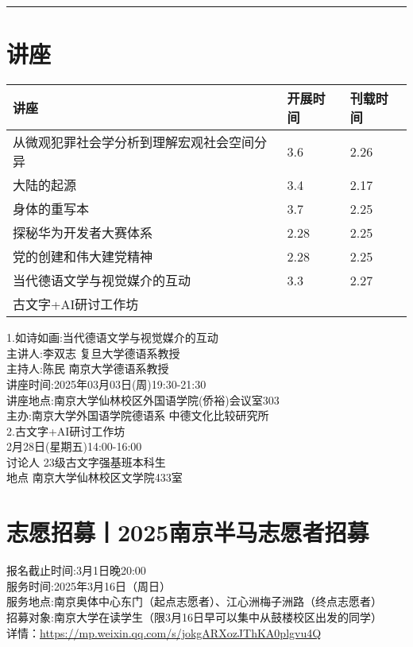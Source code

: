 \documentclass[letterpaper, 12pt]{article}
\begin{document}
\hrule
\pagebreak
\begin{multicols}{2}

\section{讲座}
\begin{tabular}{|>{\centering\arraybackslash}m{}|m{}|m{}|}
    \hline
    讲座 & 开展时间 & 刊载时间\\

    \hline\hline
    从微观犯罪社会学分析到理解宏观社会空间分异   &3.6  &2.26 \\\hline
    大陆的起源 & 3.4 & 2.17\\\hline
    身体的重写本 & 3.7 & 2.25\\\hline
    探秘华为开发者大赛体系 & 2.28 & 2.25\\\hline
    党的创建和伟大建党精神 & 2.28 & 2.25\\\hline
    当代德语文学与视觉媒介的互动 & 3.3 & 2.27\\\hline
    古文字+AI研讨工作坊\\\hline
\end{tabular}
1.如诗如画:当代德语文学与视觉媒介的互动\\
主讲人:李双志  复旦大学德语系教授\\
主持人:陈民 南京大学德语系教授\\
讲座时间:2025年03月03日(周)19:30-21:30\\
讲座地点:南京大学仙林校区外国语学院(侨裕)会议室303\\
主办:南京大学外国语学院德语系 中德文化比较研究所\\

2.古文字+AI研讨工作坊\\
2月28日(星期五)14:00-16:00\\
讨论人 23级古文字强基班本科生\\
地点 南京大学仙林校区文学院433室\\
\section{志愿招募丨2025南京半马志愿者招募}
报名截止时间:3月1日晚20:00\\
服务时间:2025年3月16日（周日）\\
服务地点:南京奥体中心东门（起点志愿者）、江心洲梅子洲路（终点志愿者）\\
招募对象:南京大学在读学生（限3月16日早可以集中从鼓楼校区出发的同学）\\
详情：\url{https://mp.weixin.qq.com/s/jokgARXozJThKA0plgvu4Q}\\

\end{multicols}
\end{document}
